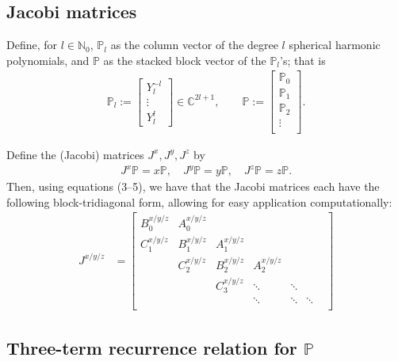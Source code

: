 \documentclass[11pt, oneside]{article}   	%
\newcommand{\C}{\mathbb{C}}
\newcommand{\No}{\mathbb{N}_0}
\newcommand{\bigP}{\mathbb{P}}
\newcommand{\Pl}{\mathbb{P}_l}
\begin{document}
\subsection{Jacobi matrices}

Define, for \(l \in \No\), \(\Pl\) as the column vector of the degree \(l\) spherical harmonic polynomials, and \(\bigP\) as the stacked block vector of the \(\Pl\)'s; that is
\begin{align}
\Pl := \begin{bmatrix}
		Y^{-l}_l \\
		\vdots \\
		Y^l_l
	\end{bmatrix} \in \C^{2l+1}, 
\quad \quad 
\bigP := \begin{bmatrix}
		\bigP_0 \\
		\hline
		\bigP_1 \\
		\hline
		\bigP_2 \\
		\vdots \\
	\end{bmatrix}.
\end{align}

Define the (Jacobi) matrices \(J^x, J^y, J^z\) by 
\begin{align}
J^x \bigP = x \bigP, \quad J^y \bigP = y \bigP, \quad J^z \bigP = z \bigP.
\end{align}
Then, using equations (3--5), we have that the Jacobi matrices each have the following block-tridiagonal form, allowing for easy application computationally:
\begin{align}
J^{x/y/z} &= \begin{bmatrix}
		B^{x/y/z}_0 & A^{x/y/z}_0 & & & & \\
		C^{x/y/z}_1 & B^{x/y/z}_1 & A^{x/y/z}_1 & & & \\
		& C^{x/y/z}_2 & B^{x/y/z}_2 & A^{x/y/z}_2  & & & \\
		& & C^{x/y/z}_3 & \ddots & \ddots & \\
		& & & \ddots & \ddots & \ddots \\
	\end{bmatrix}
\end{align}

\subsection{Three-term recurrence relation for \(\bigP\)}
\end{document}
